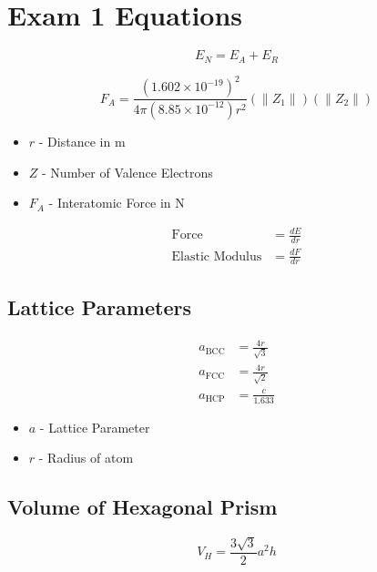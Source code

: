 \section{Exam 1 Equations} \label{sec:Exam 1}
	\begin{equation*}
		E_{N} = E_{A} + E_{R}
	\end{equation*}

	\begin{equation}
		F_{A} = \frac{\left( 1.602 \times 10^{-19} \right)^{2}}{4 \pi \left( 8.85 \times 10^{-12} \right) r^{2}} \left( \lVert Z_{1} \rVert \right) \left( \lVert Z_{2} \rVert \right)
	\end{equation}
	\begin{itemize}[noitemsep]
		\item $r$ - Distance in \si{\meter}
		\item $Z$ - Number of Valence Electrons
		\item $F_{A}$ - Interatomic Force in \si{\newton}
	\end{itemize}

	\begin{align}
		\text{Force} &= \frac{dE}{dr} \\
		\text{Elastic Modulus} &= \frac{dF}{dr}
	\end{align}

	\subsection{Lattice Parameters}
		\begin{align}
			a_{\text{BCC}} &= \frac{4r}{\sqrt{3}} \\
			a_{\text{FCC}} &= \frac{4r}{\sqrt{2}} \\
			a_{\text{HCP}} &= \frac{c}{1.633} 
		\end{align}
		\begin{itemize}[noitemsep]
			\item $a$ - Lattice Parameter
			\item $r$ - Radius of atom
		\end{itemize}

	\subsection{Volume of Hexagonal Prism}
		\begin{equation}
			V_{H} = \frac{3 \sqrt{3}}{2} a^{2} h
		\end{equation}

